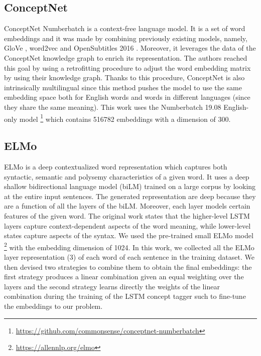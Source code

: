 \documentclass[11pt,a4paper]{article}
\begin{document}
\subsection{ConceptNet}
ConceptNet Numberbatch \cite{speer2017conceptnet} is a context-free language model. It is a set of word embeddings and it was made by combining previously existing models, namely, GloVe \cite{pennington2014glove}, word2vec \cite{mikolov2013efficient} and OpenSubtitles 2016 \cite{Lison2016OpenSubtitles2016EL}. Moreover, it leverages the data of the ConceptNet knowledge graph to enrich its representation. The authors reached this goal by using a retrofitting procedure to adjust the word embedding matrix by using their knowledge graph. Thanks to this procedure, ConceptNet is also intrinsically multilingual since this method pushes the model to use the same embedding space both for English words and words in different languages (since they share the same meaning).  This work uses the Numberbatch 19.08 English-only model \footnote{\url{https://github.com/commonsense/conceptnet-numberbatch}} which contains 516782 embeddings with a dimension of 300.

\subsection{ELMo}
ELMo \cite{Peters:2018} is a deep contextualized word representation which captures both syntactic, semantic and polysemy characteristics of a given word. It uses a deep shallow bidirectional language model (biLM) trained on a large corpus by looking at the entire input sentences. The generated representation are deep because they are a function of all the layers of the biLM. Moreover, each layer models certain features of the given word. The original work states that the higher-level LSTM layers capture context-dependent aspects of the word meaning, while lower-level states capture aspects of the syntax.
We used the pre-trained small ELMo model \footnote{\url{https://allennlp.org/elmo}} with the embedding dimension of 1024.
In this work, we collected all the ELMo layer representation (3) of each word of each sentence in the training dataset. We then devised two strategies to combine them to obtain the final embeddings: the first strategy produces a linear combination given an equal weighting over the layers and the second strategy learns directly the weights of the linear combination during the training of the LSTM concept tagger such to fine-tune the embeddings to our problem.
\end{document}
